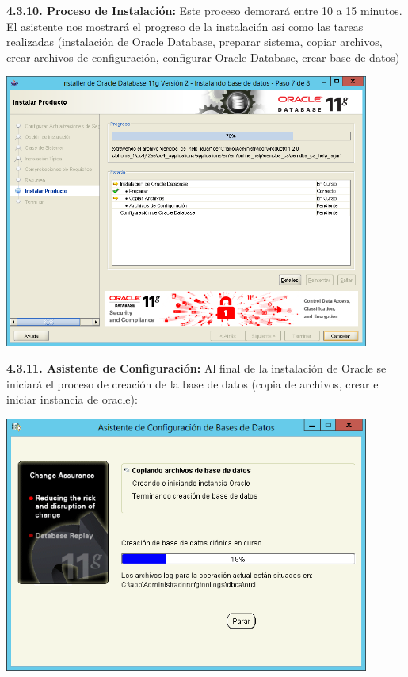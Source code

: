 \textbf {4.3.10. Proceso de Instalación:} Este proceso demorará entre 10 a 15 minutos. El asistente nos mostrará el progreso de la instalación así como las tareas realizadas (instalación de Oracle Database, preparar sistema, copiar archivos, crear archivos de configuración, configurar Oracle Database, crear base de datos)
\begin{center}
  \includegraphics[width=12cm]{Imagenes/Proceso_Instalacion_Oracle.png}
\end{center}
\break

\textbf {4.3.11. Asistente de Configuración:} Al final de la instalación de Oracle se iniciará el proceso de creación de la base de datos (copia de archivos, crear e iniciar instancia de oracle):
\begin{center}
  \includegraphics[width=12cm]{Imagenes/Asistente_Configuracion.png}
\end{center}

